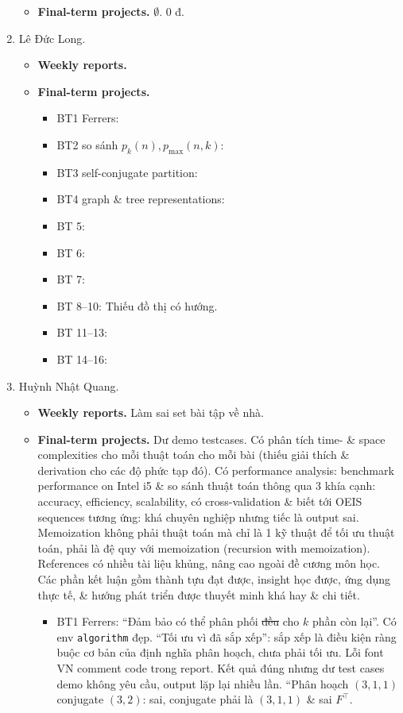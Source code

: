 \documentclass{article}
\begin{document}
\begin{enumerate}
\begin{itemize}
        \item {\bf Final-term projects.} $\emptyset$. 0 đ.
    \end{itemize}
    \item {\sc Lê Đức Long.}
    \begin{itemize}
        \item {\bf Weekly reports.}
        \item {\bf Final-term projects.}
        \begin{itemize}
            \item BT1 Ferrers:
            \item BT2 so sánh $p_k(n),p_{\max}(n,k)$:
            \item BT3 self-conjugate partition:
            \item BT4 graph \& tree representations:
            \item BT 5:
            \item BT 6:
            \item BT 7:
            \item BT 8--10: Thiếu đồ thị có hướng.
            \item BT 11--13:
            \item BT 14--16:
        \end{itemize}
    \end{itemize}
    \item {\sc Huỳnh Nhật Quang.}
    \begin{itemize}
        \item {\bf Weekly reports.} Làm sai set bài tập về nhà.
        \item {\bf Final-term projects.} Dư demo testcases. Có phân tích time- \& space complexities cho mỗi thuật toán cho mỗi bài (thiếu giải thích \& derivation cho các độ phức tạp đó). Có performance analysis: benchmark performance on Intel i5 \& so sánh thuật toán thông qua 3 khía cạnh: accuracy, efficiency, scalability, có cross-validation \& biết tới OEIS sequences tương ứng: khá chuyên nghiệp nhưng tiếc là output sai. Memoization không phải thuật toán mà chỉ là 1 kỹ thuật để tối ưu thuật toán, phải là đệ quy với memoization (recursion with memoization). References có nhiều tài liệu khủng, nâng cao ngoài đề cương môn học. Các phần kết luận gồm thành tựu đạt được, insight học được, ứng dụng thực tế, \& hướng phát triển được thuyết minh khá hay \& chi tiết.
        \begin{itemize}
            \item BT1 Ferrers: ``Đảm bảo có thể phân phối \st{đều} cho $k$ phần còn lại''. Có env {\tt algorithm} đẹp. ``Tối ưu vì đã sắp xếp'': sắp xếp là điều kiện ràng buộc cơ bản của định nghĩa phân hoạch, chưa phải tối ưu. Lỗi font VN comment code trong report. Kết quả đúng nhưng dư test cases demo không yêu cầu, output lặp lại nhiều lần. ``Phân hoạch $(3,1,1)$ conjugate $(3,2)$: sai, conjugate phải là $(3,1,1)$ \& sai $F^\top$.

\end{itemize}
\end{itemize}
\end{enumerate}
\end{document}
